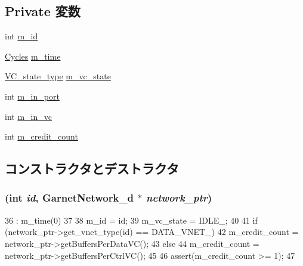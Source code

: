 \subsection*{Private 変数}
\begin{DoxyCompactItemize}
\item 
int \hyperlink{classOutVcState__d_aad966617e7e050bedbead762727808a5}{m\_\-id}
\item 
\hyperlink{classCycles}{Cycles} \hyperlink{classOutVcState__d_ac39faf9ea84c2e7518ba2f960c661636}{m\_\-time}
\item 
\hyperlink{NetworkHeader_8hh_aaafaa208359111dcd9f4d47ff377da76}{VC\_\-state\_\-type} \hyperlink{classOutVcState__d_a86eb725d7cda610fb5009d20a3690a4d}{m\_\-vc\_\-state}
\item 
int \hyperlink{classOutVcState__d_a67a47daa432fd29dd37c5f1345f12916}{m\_\-in\_\-port}
\item 
int \hyperlink{classOutVcState__d_ac83d75ee4817ddd9255a55da077fe2c0}{m\_\-in\_\-vc}
\item 
int \hyperlink{classOutVcState__d_aa125042f401c86607d5ae44935b68631}{m\_\-credit\_\-count}
\end{DoxyCompactItemize}


\subsection{コンストラクタとデストラクタ}
\hypertarget{classOutVcState__d_ad33dd53fd18c50a60742ba79d00c0aa3}{
\subsubsection[{OutVcState\_\-d}]{ (int {\em id}, \/  {\bf GarnetNetwork\_\-d} $\ast$ {\em network\_\-ptr})}}
\label{classOutVcState__d_ad33dd53fd18c50a60742ba79d00c0aa3}



\begin{DoxyCode}
36     : m_time(0)
37 {
38     m_id = id;
39     m_vc_state = IDLE_;
40 
41     if (network_ptr->get_vnet_type(id) == DATA_VNET_)
42         m_credit_count = network_ptr->getBuffersPerDataVC();
43     else
44         m_credit_count = network_ptr->getBuffersPerCtrlVC();
45 
46     assert(m_credit_count >= 1);
47 }
\end{DoxyCode}


